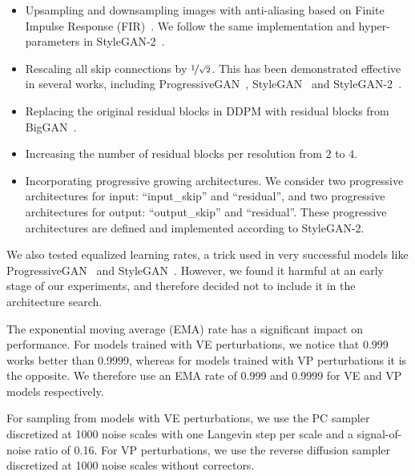 \begin{itemize}
    \item Upsampling and downsampling images with anti-aliasing based on Finite Impulse Response (FIR)~\citep{zhang2019shiftinvar}. We follow the same implementation and hyper-parameters in StyleGAN-2~\citep{Karras2019stylegan2}.
    \item Rescaling all skip connections by $\nicefrac{1}{\sqrt{2}}$. This has been demonstrated effective in several works, including ProgressiveGAN~\citep{karras2018progressive}, StyleGAN~\citep{karras2019style} and StyleGAN-2~\citep{Karras2019stylegan2}.
    \item Replacing the original residual blocks in DDPM with residual blocks from BigGAN~\citep{brock2018large}.
    \item Increasing the number of residual blocks per resolution from $2$ to $4$.
    \item Incorporating progressive growing architectures. We consider two progressive architectures for input: ``input\_skip'' and ``residual'', and two progressive architectures for output: ``output\_skip'' and ``residual''. These progressive architectures are defined and implemented according to StyleGAN-2.
\end{itemize}

We also tested equalized learning rates, a trick used in very successful models like ProgressiveGAN~\citep{karras2018progressive} and StyleGAN~\citep{karras2019style}. However, we found it harmful at an early stage of our experiments, and therefore decided not to include it in the architecture search.

The exponential moving average (EMA) rate has a significant impact on performance. For models trained with VE perturbations, we notice that 0.999 works better than 0.9999, whereas for models trained with VP perturbations it is the opposite. We therefore use an EMA rate of 0.999 and 0.9999 for VE and VP models respectively.

For sampling from models with VE perturbations, we use the PC sampler discretized at 1000 noise scales with one Langevin step per scale and a signal-of-noise ratio of 0.16. For VP perturbations, we use the reverse diffusion sampler discretized at 1000 noise scales without correctors.

